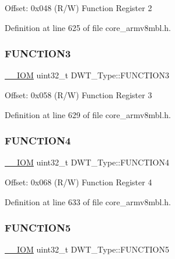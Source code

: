 Offset\+: 0x048 (R/W) Function Register 2 

Definition at line 625 of file core\+\_\+armv8mbl.\+h.

\mbox{\label{struct_d_w_t___type_a52d4ff278fae6f9216c63b74ce328841}} 
\subsubsection{\texorpdfstring{F\+U\+N\+C\+T\+I\+O\+N3}{FUNCTION3}}
{\footnotesize\ttfamily \hyperlink{core__sc300_8h_ab6caba5853a60a17e8e04499b52bf691}{\+\_\+\+\_\+\+I\+OM} uint32\+\_\+t D\+W\+T\+\_\+\+Type\+::\+F\+U\+N\+C\+T\+I\+O\+N3}

Offset\+: 0x058 (R/W) Function Register 3 

Definition at line 629 of file core\+\_\+armv8mbl.\+h.

\mbox{\label{struct_d_w_t___type_a2fa7fd33c3fae711e0d0e683f29b5b6d}} 
\subsubsection{\texorpdfstring{F\+U\+N\+C\+T\+I\+O\+N4}{FUNCTION4}}
{\footnotesize\ttfamily \hyperlink{core__sc300_8h_ab6caba5853a60a17e8e04499b52bf691}{\+\_\+\+\_\+\+I\+OM} uint32\+\_\+t D\+W\+T\+\_\+\+Type\+::\+F\+U\+N\+C\+T\+I\+O\+N4}

Offset\+: 0x068 (R/W) Function Register 4 

Definition at line 633 of file core\+\_\+armv8mbl.\+h.

\mbox{\label{struct_d_w_t___type_a2f33ef0ce606e4850ecde8d044f7bb5b}} 
\subsubsection{\texorpdfstring{F\+U\+N\+C\+T\+I\+O\+N5}{FUNCTION5}}
{\footnotesize\ttfamily \hyperlink{core__sc300_8h_ab6caba5853a60a17e8e04499b52bf691}{\+\_\+\+\_\+\+I\+OM} uint32\+\_\+t D\+W\+T\+\_\+\+Type\+::\+F\+U\+N\+C\+T\+I\+O\+N5}


